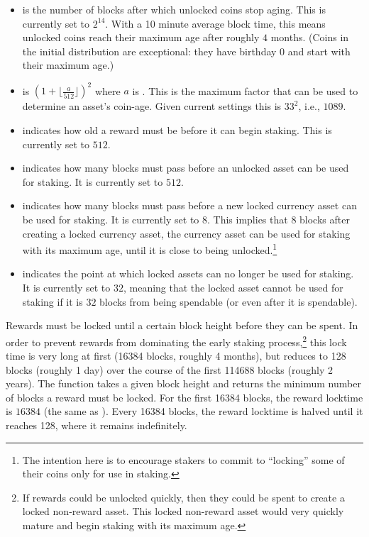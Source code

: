 \begin{itemize}
\item {} is the number of blocks after which unlocked coins
stop aging. This is currently set to $2^{14}$. With a 10 minute average block time,
this means unlocked coins reach their maximum age after roughly $4$ months.
(Coins in the initial distribution are exceptional: they have birthday $0$ and start with their maximum age.)
\item {} is $(1+\lfloor \frac{a}{512}\rfloor)^2$ where $a$ is {}.
This is the maximum factor that can be used to determine an asset's coin-age.
Given current settings this is $33^2$, i.e., $1089$.
\item {} indicates how old a reward must be before it can begin staking. This is currently set to $512$.
\item {} indicates how many blocks must pass before
an unlocked asset can be used for staking. It is currently set to $512$.
\item {} indicates how many blocks must pass before
a new locked currency asset can be used for staking.
It is currently set to $8$. This implies that $8$ blocks after creating a locked
currency asset, the currency asset can be used for staking with its maximum age,
until it is close to being unlocked.\footnote{The intention here is to encourage
stakers to commit to ``locking'' some of their coins only for use in staking.}
\item {} indicates the point at which locked assets can
no longer be used for staking. It is currently set to $32$, meaning that
the locked asset cannot be used for staking if it is $32$ blocks from being spendable
(or even after it is spendable).
\end{itemize}

Rewards must be locked until a certain block height before they can be spent.
In order to prevent rewards from dominating the early staking process,\footnote{If rewards could be unlocked quickly, then they could be
spent to create a locked non-reward asset. This locked non-reward asset would
very quickly mature and begin staking with its maximum age.}
this lock time is very long at first (16384 blocks, roughly 4 months), but reduces to
128 blocks (roughly 1 day) over the course of the first 114688 blocks (roughly 2 years).
The function {} takes a given block height and
returns the minimum number of blocks a reward must be locked.
For the first 16384 blocks, the reward locktime is $16384$ (the same as {}).
Every 16384 blocks, the reward locktime is halved
until it reaches 128, where it remains indefinitely.

